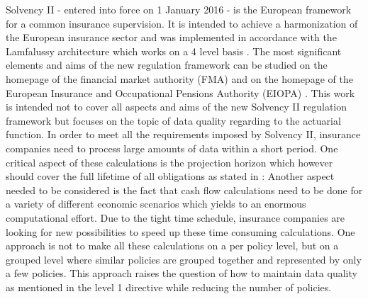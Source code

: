 Solvency II - entered into force on 1 January 2016 - is the European framework for a common insurance supervision. It is intended to achieve a harmonization of the European insurance sector and was implemented in accordance with the Lamfalussy architecture which works on a 4 level basis \cite{Lamfalussy_homepage}. The most significant elements and aims of the new regulation framework can be studied on the homepage of the financial market authority (FMA) \cite{FMA_homepage} and on the homepage of the  European Insurance and Occupational Pensions Authority (EIOPA) \cite{EIOPA_homepage}. This work is intended not to cover all aspects and aims of the new Solvency II regulation framework but focuses on the topic of data quality regarding to the actuarial function. In order to meet all the requirements imposed by Solvency II, insurance companies need to process large amounts of data within a short period. One critical aspect of these calculations is the projection horizon which however should cover the full lifetime of all obligations as stated in \cite{Time_horizon}:
Another aspect needed to be considered is the fact that cash flow calculations need to be done for a variety of different economic scenarios which yields to an enormous computational effort. Due to the tight time schedule, insurance companies are looking for new possibilities to speed up these time consuming calculations. One approach is not to make all these calculations on a per policy level, but on a grouped level where similar policies are grouped together and represented by only a few policies. This approach raises the question of how to maintain data quality as mentioned in the level 1 directive \cite{Directive} while reducing the number of policies.


